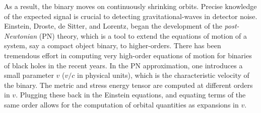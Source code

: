 % 
% 
As a result, the binary moves on continuously shrinking orbits.
Precise knowledge of the expected signal is crucial to detecting gravitational-waves
in detector noise. Einstein, Droste, de Sitter, and Lorentz,
began the development of the {\it post-Newtonian} (PN) theory, which is a
tool to extend the equations of motion of a system, say a compact object 
binary, to higher-orders. There has been tremendous effort in computing 
very high-order equations of motion for binaries of black holes in the
recent years. In the PN approximation, one introduces a small parameter 
$v$ ($v/c$ in physical units), which is the characteristic velocity of the binary.
The metric and
stress energy tensor are computed at different orders in 
$v$. Plugging these back in the Einstein equations, and equating terms of 
the same order allows for the computation of orbital quantities
as expansions in $v$. 



